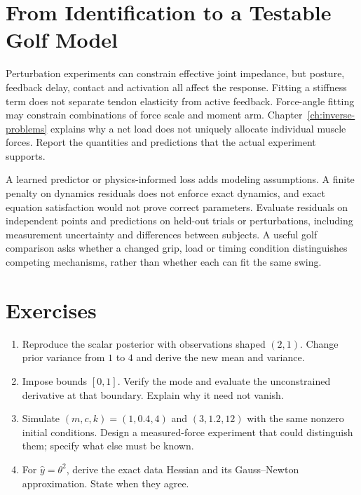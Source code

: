 \section{From Identification to a Testable Golf Model}
Perturbation experiments can constrain effective joint impedance, but posture,
feedback delay, contact and activation all affect the response. Fitting a stiffness
term does not separate tendon elasticity from active feedback. Force-angle fitting
may constrain combinations of force scale and moment arm.
Chapter~\ref{ch:inverse-problems} explains why a net load does not uniquely allocate
individual muscle forces. Report the quantities and predictions that the actual
experiment supports.

A learned predictor or physics-informed loss adds modeling assumptions. A finite
penalty on dynamics residuals does not enforce exact dynamics, and exact equation
satisfaction would not prove correct parameters. Evaluate residuals on independent
points and predictions on held-out trials or perturbations, including measurement
uncertainty and differences between subjects. A useful golf comparison asks whether
a changed grip, load or timing condition distinguishes competing mechanisms,
rather than whether each can fit the same swing.

\section*{Exercises}
\begin{enumerate}
 \item Reproduce the scalar posterior with observations shaped $(2,1)$.
 Change prior variance from $1$ to $4$ and derive the new mean and variance.
 \item Impose bounds $[0,1]$. Verify the mode and evaluate the unconstrained
 derivative at that boundary. Explain why it need not vanish.
 \item Simulate $(m,c,k)=(1,0.4,4)$ and $(3,1.2,12)$ with the same nonzero initial
 conditions. Design a measured-force experiment that could distinguish them;
 specify what else must be known.
 \item For $\hat y=\theta^2$, derive the exact data Hessian and its Gauss--Newton
 approximation. State when they agree.
\end{enumerate}
